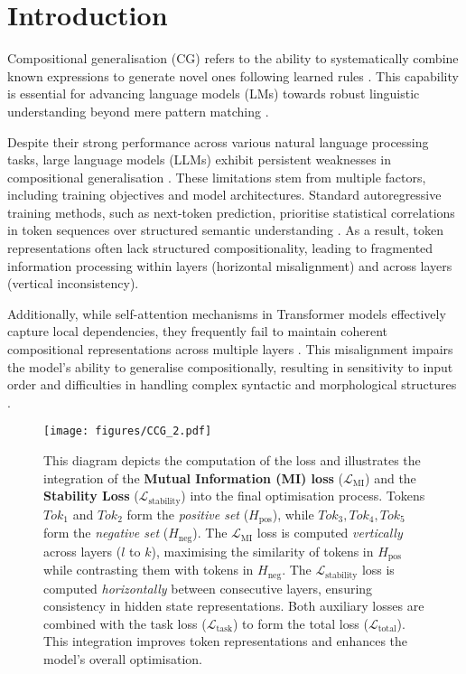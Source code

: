 \section{Introduction}\label{sec:intro}
Compositional generalisation (CG) refers to the ability to systematically combine known expressions to generate novel ones following learned rules \cite{Partee1984}. This capability is essential for advancing language models (LMs) towards robust linguistic understanding beyond mere pattern matching \cite{ram2024makes}. 

Despite their strong performance across various natural language processing tasks, large language models (LLMs) exhibit persistent weaknesses in compositional generalisation \cite{ijcai2020p708, kim2020cogs, aljaafari2024interpreting}. These limitations stem from multiple factors, including training objectives and model architectures. Standard autoregressive training methods, such as next-token prediction, prioritise statistical correlations in token sequences over structured semantic understanding \cite{yin2023consistency, dziri2024faith}. As a result, token representations often lack structured compositionality, leading to fragmented information processing within layers (horizontal misalignment) and across layers (vertical inconsistency). 

Additionally, while self-attention mechanisms in Transformer models effectively capture local dependencies, they frequently fail to maintain coherent compositional representations across multiple layers \cite{murty-etal-2023-pushdown}. This misalignment impairs the model's ability to generalise compositionally, resulting in sensitivity to input order \cite{ismayilzada2024evaluating} and difficulties in handling complex syntactic and morphological structures \cite{aljaafari2024interpreting}. 

\begin{figure*}
    \centering
    \texttt{[image: figures/CCG\_2.pdf]}
 \caption{
This diagram depicts the computation of the loss and illustrates the integration of the \textbf{Mutual Information (MI) loss} (\(\mathcal{L}_{\text{MI}}\)) and the \textbf{Stability Loss} (\(\mathcal{L}_{\text{stability}}\)) into the final optimisation process. Tokens \(Tok_1\) and \(Tok_2\) form the \textit{positive set} (\(H_{\text{pos}}\)), while \(Tok_3, Tok_4, Tok_5\) form the \textit{negative set} (\(H_{\text{neg}}\)). The \(\mathcal{L}_{\text{MI}}\) loss is computed \textit{vertically} across layers (\(l\) to \(k\)), maximising the similarity of tokens in \(H_{\text{pos}}\) while contrasting them with tokens in \(H_{\text{neg}}\). The \(\mathcal{L}_{\text{stability}}\) loss is computed \textit{horizontally} between consecutive layers, ensuring consistency in hidden state representations. Both auxiliary losses are combined with the task loss (\(\mathcal{L}_{\text{task}}\)) to form the total loss (\(\mathcal{L}_{\text{total}}\)). This integration improves token representations and enhances the model's overall optimisation.}
    \label{fig:CCG}
\end{figure*}

